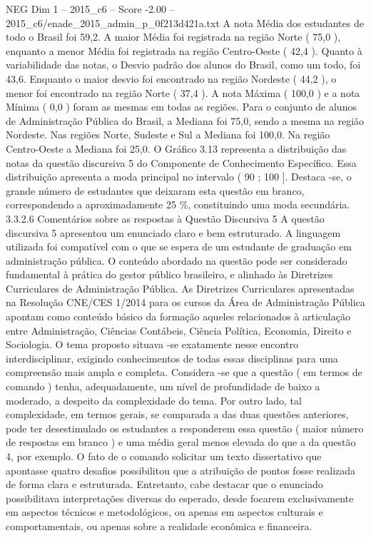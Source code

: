 \begin{textsample}{NEG Dim 1 – 2015\_c6 – Score -2.00 – 2015\_c6/enade\_2015\_admin\_p\_0f213d421a.txt}
A nota Média dos estudantes de todo o Brasil foi 59,2.
A maior Média foi registrada na região Norte ( 75,0 ), enquanto a menor Média foi registrada na região Centro-Oeste ( 42,4 ).
Quanto à variabilidade das notas, o Desvio padrão dos alunos do Brasil, como um todo, foi 43,6.
Enquanto o maior desvio foi encontrado na região Nordeste ( 44,2 ), o menor foi encontrado na região Norte ( 37,4 ).
A nota Máxima ( 100,0 ) e a nota Mínima ( 0,0 ) foram as mesmas em todas as regiões.
Para o conjunto de alunos de Administração Pública do Brasil, a Mediana foi 75,0, sendo a mesma na região Nordeste.
Nas regiões Norte, Sudeste e Sul a Mediana foi 100,0.
Na região Centro-Oeste a Mediana foi 25,0.
O Gráfico 3.13 representa a distribuição das notas da questão discursiva 5 do Componente de Conhecimento Específico.
Essa distribuição apresenta a moda principal no intervalo ( 90 ; 100 ].
Destaca -se, o grande número de estudantes que deixaram esta questão em branco, correspondendo a aproximadamente 25 \%, constituindo uma moda secundária. 3.3.2.6 Comentários sobre as respostas à Questão Discursiva 5 A questão discursiva 5 apresentou um enunciado claro e bem estruturado.
A linguagem utilizada foi compatível com o que se espera de um estudante de graduação em administração pública.
O conteúdo abordado na questão pode ser considerado fundamental à prática do gestor público brasileiro, e alinhado às Diretrizes Curriculares de Administração Pública.
As Diretrizes Curriculares apresentadas na Resolução CNE/CES 1/2014 para os cursos da Área de Administração Pública apontam como conteúdo básico da formação aqueles relacionados à articulação entre Administração, Ciências Contábeis, Ciência Política, Economia, Direito e Sociologia.
O tema proposto situava -se exatamente nesse encontro interdisciplinar, exigindo conhecimentos de todas essas disciplinas para uma compreensão mais ampla e completa.
Considera -se que a questão ( em termos de comando ) tenha, adequadamente, um nível de profundidade de baixo a moderado, a despeito da complexidade do tema.
Por outro lado, tal complexidade, em termos gerais, se comparada a das duas questões anteriores, pode ter desestimulado os estudantes a responderem essa questão ( maior número de respostas em branco ) e uma média geral menos elevada do que a da questão 4, por exemplo.
O fato de o comando solicitar um texto dissertativo que apontasse quatro desafios possibilitou que a atribuição de pontos fosse realizada de forma clara e estruturada.
Entretanto, cabe destacar que o enunciado possibilitava interpretações diversas do esperado, desde focarem exclusivamente em aspectos técnicos e metodológicos, ou apenas em aspectos culturais e comportamentais, ou apenas sobre a realidade econômica e financeira.

\end{textsample}
